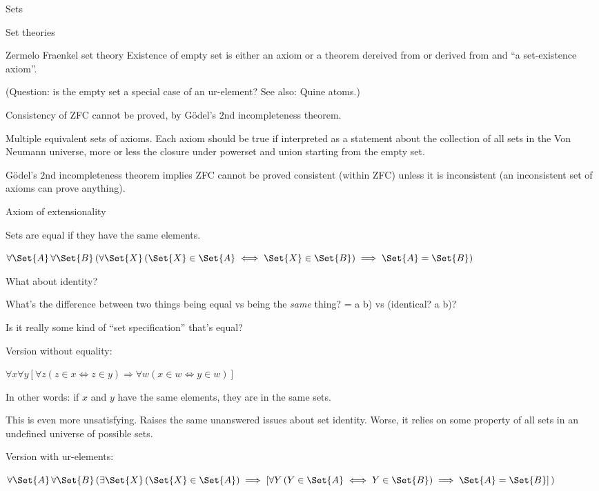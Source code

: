 \begin{plSection}{Sets}
\begin{plSection}{Set theories}
\begin{plSection}{Zermelo Fraenkel set theory}
Existence of empty set is either an 
axiom\cite{wiki:AxiomOfEmptySet}
or a theorem dereived from 
or derived from 
and ``a set-existence axiom''.

(Question: is the empty set a special case of an ur-element?
See also: Quine atoms\cite{wiki:Urelement}.)

Consistency of \textsf{ZFC} cannot be proved, 
by G\"{o}del's $2$nd incompleteness theorem.

Multiple equivalent sets of axioms.
Each axiom should be true if interpreted as a statement about the
collection of all sets in the Von Neumann 
universe\cite{wiki:VonNeumannUniverse},
more or less the closure under powerset and union starting
from the empty set.

G\"{o}del's $2$nd incompleteness theorem implies \textsf{ZFC}
cannot be proved consistent (within \textsf{ZFC}) 
unless it is inconsistent 
(an inconsistent set of axioms can prove anything).

\begin{plSection}{Axiom of extensionality}

Sets are equal if they have the same 
elements.\cite{wiki:AxiomOfExtensionality,wiki:Extensionality}

$\forall \Set{A}\,\forall \Set{B}\,
(\forall \Set{X}\,(\Set{X}\in \Set{A}\iff \Set{X}\in \Set{B})
\implies \Set{A}=\Set{B})$

What about identity? 

What's the difference between two things being equal vs
being the \textit{same} thing? 
\textsf{= a b)} vs \textsf{(identical? a b)}?

Is it really some kind of ``set specification'' that's equal?

Version without equality:

$\forall x
\forall y
[\forall z(z\in x\Leftrightarrow z\in y)
\Rightarrow 
\forall w(x\in w\Leftrightarrow y\in w)]$

In other words: if $x$ and $y$ have the same elements, 
they are in the same sets.

This is even more unsatisfying. 
Raises the same unanswered issues about set identity.
Worse, it relies on some property of all sets in an undefined 
universe of possible sets.

Version with ur-elements:

$\forall \Set{A}\,
\forall \Set{B}\,
(\exists \Set{X}\,(\Set{X}\in \Set{A})
\implies
 [\forall Y\,
 (Y\in \Set{A}
 \iff 
 Y\in \Set{B}) \implies \Set{A}=\Set{B}]\,)$
 

\end{plSection}
\end{plSection}
\end{plSection}
\end{plSection}

